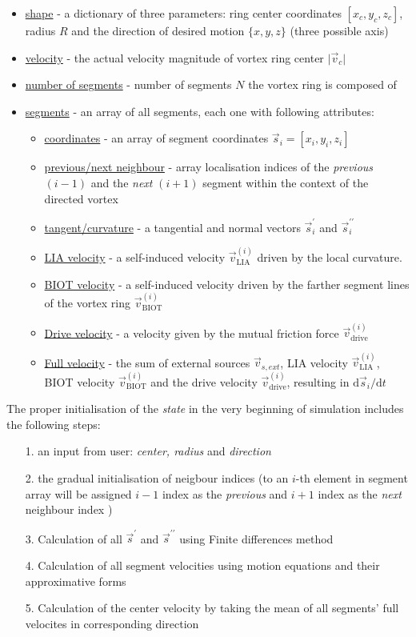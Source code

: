 \begin{itemize}
	\item \underline{shape} - a dictionary of three parameters: ring center coordinates $[x_c,y_c,z_c]$, radius $R$ and the direction of desired motion $\{x, y, z\}$ (three possible axis)
	\item \underline{velocity} - the actual velocity magnitude of vortex ring center $\vert \vec{v}_c \vert$
	\item \underline{number of segments} - number of segments $N$ the vortex ring is composed of
	\item \underline{segments} - an array of all segments, each one with following attributes:
	\begin{itemize}
		\item \underline{coordinates} - an array of segment coordinates $\vec{s}_i = [x_i,y_i,z_i]$
		\item \underline{previous/next neighbour} - array localisation indices of the \textit{previous} $(i-1)$ and the \textit{next} $(i+1)$ segment within the context of the directed vortex
		\item \underline{tangent/curvature} - a tangential and normal vectors $\vec{s}^{\prime}_i$ and $\vec{s}^{\prime\prime}_i$

		\item \underline{LIA velocity} - a self-induced velocity $\vec{v}_{\text{LIA}}^{(i)}$ driven by the local curvature.
		\item \underline{BIOT velocity} - a self-induced velocity driven by the farther segment lines of the vortex ring $\vec{v}_{\text{BIOT}}^{(i)}$

		\item \underline{Drive velocity} - a velocity given by the mutual friction force $\vec{v}_{\text{drive}}^{(i)}$
		\item \underline{Full velocity} - the sum of external sources $\vec{v}_{s,ext}$, LIA velocity $\vec{v}_{\text{LIA}}^{(i)}$, BIOT velocity $\vec{v}_{\text{BIOT}}^{(i)}$ and the drive velocity $\vec{v}_{\text{drive}}^{(i)}$, resulting in $\text{d}\vec{s}_i / \text{d}t$
	\end{itemize}
\end{itemize}

The proper initialisation of the \textit{state} in the very beginning of simulation includes the following steps:
\begin{itemize}
	\item[1.] an input from user: \textit{center, radius} and \textit{direction}
	\item[2.] the gradual initialisation of neigbour indices (to an $i$-th element in segment array will be assigned $i-1$ index as the \textit{previous} and $i+1$ index as the \textit{next} neighbour index )
	\item[3.] Calculation of all $\vec{s}^{\prime}$ and $\vec{s}^{\prime\prime}$ using Finite differences method
	\item[4.] Calculation of all segment velocities using motion equations and their approximative forms
	\item[5.] Calculation of the center velocity by taking the mean of all segments' full velocites in corresponding direction
\end{itemize}


